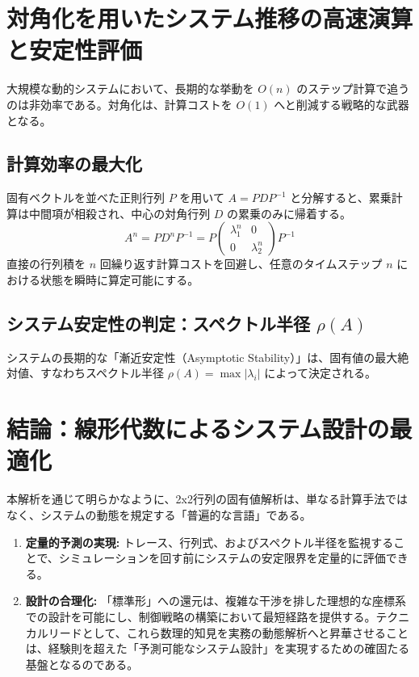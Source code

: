 ﻿\documentclass[12pt]{bxjsarticle}
\begin{document}
\section{対角化を用いたシステム推移の高速演算と安定性評価}

大規模な動的システムにおいて、長期的な挙動を  $O(n)$  のステップ計算で追うのは非効率である。対角化は、計算コストを  $O(1)$  へと削減する戦略的な武器となる。

\subsection{計算効率の最大化}

固有ベクトルを並べた正則行列  $P$  を用いて  $A = PDP^{-1}$  と分解すると、累乗計算は中間項が相殺され、中心の対角行列  $D$  の累乗のみに帰着する。  $$A^n = P D^n P^{-1} = P \begin{pmatrix} \lambda_1^n & 0 \\ 0 & \lambda_2^n \end{pmatrix} P^{-1}$$  直接の行列積を  $n$  回繰り返す計算コストを回避し、任意のタイムステップ  $n$  における状態を瞬時に算定可能にする。

\subsection{システム安定性の判定：スペクトル半径  $\rho(A)$}

システムの長期的な「漸近安定性（Asymptotic Stability）」は、固有値の最大絶対値、すなわちスペクトル半径  $\rho(A) = \max |\lambda_i|$  によって決定される。


\section{結論：線形代数によるシステム設計の最適化}

本解析を通じて明らかなように、2x2行列の固有値解析は、単なる計算手法ではなく、システムの動態を規定する「普遍的な言語」である。

\begin{enumerate}
\item \textbf{定量的予測の実現:}  トレース、行列式、およびスペクトル半径を監視することで、シミュレーションを回す前にシステムの安定限界を定量的に評価できる。
\item \textbf{設計の合理化:}  「標準形」への還元は、複雑な干渉を排した理想的な座標系での設計を可能にし、制御戦略の構築において最短経路を提供する。テクニカルリードとして、これら数理的知見を実務の動態解析へと昇華させることは、経験則を超えた「予測可能なシステム設計」を実現するための確固たる基盤となるのである。
\end{enumerate}
\end{document}
